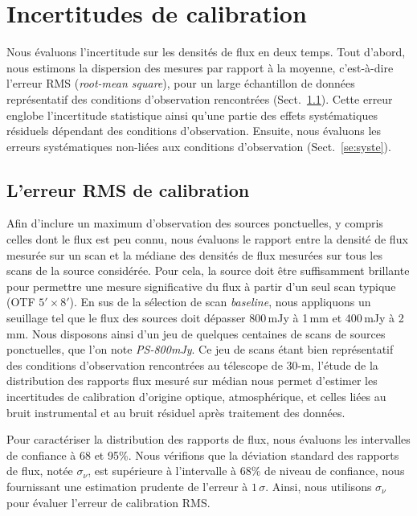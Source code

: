 %
%
%
%
%
%
%
%
%
%
\section{Incertitudes de calibration}

Nous évaluons l'incertitude sur les densités de flux en deux
temps. Tout d'abord, nous estimons la dispersion des mesures par
rapport à la moyenne, c'est-à-dire l'erreur RMS (\emph{root-mean
  square}), pour un large échantillon de données représentatif des
conditions d'observation rencontrées (Sect.~\ref{se:rms_error}). Cette
erreur englobe l'incertitude statistique ainsi qu'une partie des
effets systématiques résiduels dépendant des conditions
d'observation. Ensuite, nous évaluons les erreurs systématiques
non-liées aux conditions d'observation (Sect.~\ref{se:syste}).

\subsection{L'erreur RMS de calibration}
\label{se:rms_error}

Afin d'inclure un maximum d'observation des sources ponctuelles, y
compris celles dont le flux est peu connu, nous évaluons le rapport
entre la densité de flux mesurée sur un scan et la médiane des
densités de flux mesurées sur tous les scans de la source considérée.
Pour cela, la source doit être suffisamment brillante pour permettre
une mesure significative du flux à partir d'un seul scan typique (OTF $5'
\times 8'$). En sus de la sélection de scan \emph{baseline}, nous
appliquons un seuillage tel que le flux des sources doit dépasser
800\,mJy à 1\,mm et 400\,mJy à 2\,mm. Nous disposons ainsi d'un jeu de
quelques centaines de scans de sources ponctuelles, que l'on note
\emph{PS-800mJy}. Ce jeu de scans
étant bien représentatif des conditions d'observation
rencontrées au télescope de 30-m, l'étude de la distribution des
rapports flux mesuré sur médian nous permet d'estimer les incertitudes
de calibration d'origine optique, atmosphérique, et celles liées au
bruit instrumental et au bruit résiduel après traitement des données.

Pour caractériser la distribution des rapports de flux, nous évaluons
les intervalles de confiance à 68 et 95\%. Nous vérifions que la 
déviation standard des rapports de flux, notée $\sigma_\nu$, est
supérieure à l'intervalle à 68\% de niveau de confiance, nous
fournissant une estimation prudente de l'erreur à $1\,\sigma$. Ainsi,
nous utilisons $\sigma_\nu$ pour évaluer l'erreur de calibration RMS.

